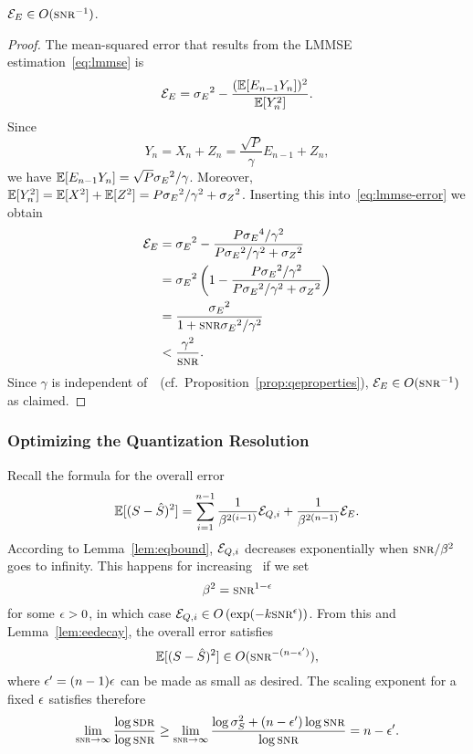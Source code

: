 \begin{lemma}
  \label{lem:eedecay}
  $\Ee \in O(\snr^{-1})$. 
\end{lemma}
\begin{proof}
  The mean-squared error that results from the LMMSE estimation~\eqref{eq:lmmse}
  is
  \begin{equation}
    \label{eq:lmmse-error}
    {{\mathcal{E}}_E} = {{\sigma_E}^2} - \frac{(\mathbb{E}[E_{n-1}
    Y_n])^2}{\mathbb{E}[Y_n^2]}. 
  \end{equation}
  Since
  \begin{equation*}
    Y_n = X_n + Z_n = \frac{\sqrt{P}}{\gamma} E_{n-1} + Z_n,
  \end{equation*}
  we have $\mathbb{E}[E_{n-1}Y_n] = \sqrt{P}{{\sigma_E}^2}/\gamma$. Moreover, $\mathbb{E}[Y_n^2] = \mathbb{E}[X^2]
  + \mathbb{E}[Z^2] = P{{\sigma_E}^2} / \gamma^2 +{{\sigma_Z}^2}$.  Inserting this
  into~\eqref{eq:lmmse-error} we obtain
  \begin{align*}
    \Ee &= \seq - \frac{P \se^4/\gamma^2}{P\seq/\gamma^2 + \szq} \\
    &= \seq \left( 1 - \frac{P\seq/\gamma^2}{P\seq/\gamma^2 + \szq} \right) \\
    &= \frac{\seq}{1 + \snr\seq/\gamma^2} \\
    & < \frac{\gamma^2}{\snr}.
  \end{align*}
  Since $\gamma$ is independent of~\snr\ (cf.\
  Proposition~\ref{prop:qeproperties}), $\Ee \in O(\snr^{-1})$ as claimed.
\end{proof}


\subsubsection{Optimizing the Quantization Resolution}

Recall the formula for the overall error
\begin{equation*}
  \mathbb{E}[(S-{\hat{S}})^2] = \sum_{i=1}^{n-1} \frac{1}{\beta^{2(i-1)}} {{\mathcal{E}}_{Q,i}} +
  \frac{1}{\beta^{2(n-1)}} {{\mathcal{E}}_E}.
\end{equation*}
According to Lemma~\ref{lem:eqbound}, ${{\mathcal{E}}_{Q,i}}$ decreases exponentially
when $\snr/\beta^2$ goes to infinity. This happens for increasing \snr\ if we
set \eg
\begin{equation*}
  \beta^2 = \snr^{1-\e}
\end{equation*}
for some $\epsilon > 0$, in which case $\Eqi \in O\left(\exp(-k \snr^\e) \right)$.
From this and Lemma~\ref{lem:eedecay}, the overall error satisfies
\begin{equation}
  \label{eq:overallO}
  \E[(S-\Sh)^2] \in O(\snr^{-(n - \e')}),
\end{equation}
where $\epsilon' = (n-1)\epsilon$ can be made as small as desired. The scaling exponent for
a fixed $\epsilon$ satisfies therefore
\begin{equation}
  \label{eq:sdrepsilon}
  \limtoinf{\snr} \frac{\log\sdr}{\log\snr} \ge
  \limtoinf{\snr} \frac{\log \ssq + (n - \e') \log\snr}{\log \snr} = n - \e'. 
\end{equation}

